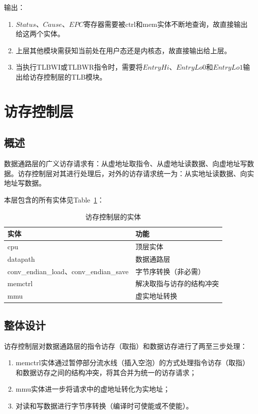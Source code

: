 \documentclass{article}
\begin{document}
\begin{spacing}{1.4}
输出：
\begin{enumerate}
    \item $Status$、$Cause$、$EPC$寄存器需要被ctrl和mem实体不断地查询，故直接输出给这两个实体。
    \item 上层其他模块需获知当前处在用户态还是内核态，故直接输出给上层。
    \item 当执行TLBWI或TLBWR指令时，需要将$EntryHi$、$EntryLo0$和$EntryLo1$输出给访存控制层的TLB模块。
\end{enumerate}

\section{访存控制层}

\subsection{概述}

数据通路层的广义访存请求有：从虚地址取指令、从虚地址读数据、向虚地址写数据。访存控制层对其进行处理后，对外的访存请求统一为：从实地址读数据、向实地址写数据。

本层包含的所有实体见Table~\ref{tb:mem-entities}：

\begin{table}[!htb]
\begin{center}
\begin{tabular}{p{7.5cm}|p{7.5cm}}  
\hline  
\textbf{实体}&\textbf{功能} \\
\hline cpu & 顶层实体 \\
\hline datapath & 数据通路层 \\
\hline conv\_endian\_load、conv\_endian\_save & 字节序转换（非必需） \\
\hline memctrl & 解决取指与访存的结构冲突 \\
\hline mmu & 虚实地址转换 \\
\hline 
\end{tabular}  
\caption{访存控制层的实体}
\label{tb:mem-entities}
\end{center}
\end{table}

\subsection{整体设计}

访存控制层对数据通路层的指令访存（取指）和数据访存进行了两至三步处理：

\begin{enumerate}
    \item memctrl实体通过暂停部分流水线（插入空泡）的方式处理指令访存（取指）和数据访存之间的结构冲突，将其合并为统一的访存请求；
    \item mmu实体进一步将请求中的虚地址转化为实地址；
    \item 对读和写数据进行字节序转换（编译时可使能或不使能）。
\end{enumerate}


\end{spacing}
\end{document}

